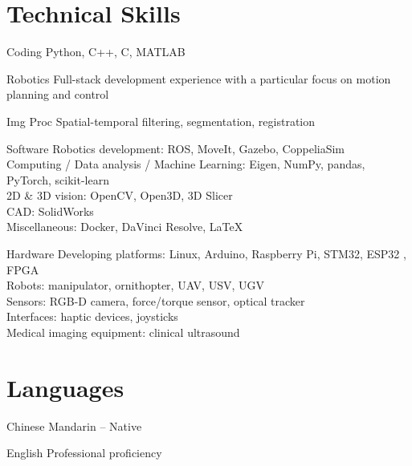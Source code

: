 \documentclass[11pt,letterpaper]{report}
\begin{document}
\section*{Technical Skills}
\begin{tablist}
	\item[Coding] \tab Python, C++, C, MATLAB
	\item[Robotics] \tab Full-stack development experience with a particular focus on motion planning and control
	\item [Img Proc] \tab Spatial-temporal filtering, segmentation, registration
	\item[Software] \tab Robotics development: ROS, MoveIt, Gazebo, CoppeliaSim\\
	Computing / Data analysis / Machine Learning: Eigen, NumPy, pandas, PyTorch, scikit-learn\\
	2D \& 3D vision: OpenCV, Open3D, 3D Slicer\\
	CAD: SolidWorks\\
	Miscellaneous: Docker, DaVinci Resolve, \LaTeX
	\item[Hardware] \tab Developing platforms: Linux, Arduino, Raspberry Pi, STM32, ESP32	, FPGA\\
	Robots: manipulator, ornithopter, UAV, USV, UGV\\ 
	Sensors: RGB-D camera, force/torque sensor, optical tracker\\
	Interfaces: haptic devices, joysticks\\
	Medical imaging equipment: clinical ultrasound
\end{tablist}


\section*{Languages}
\begin{tablist}
	\item[Chinese] \tab Mandarin -- Native
	\item[English] \tab Professional proficiency
\end{tablist}
\newpage
\end{document}
